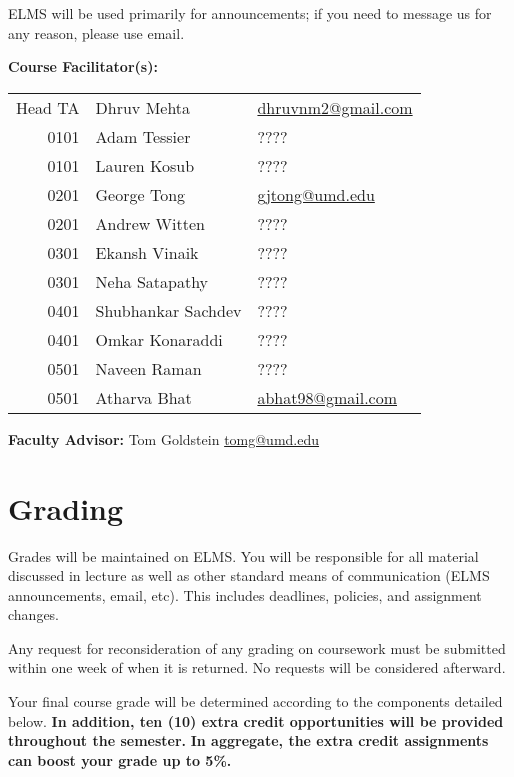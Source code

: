 \documentclass[12pt]{article}
\begin{document}
ELMS will be used primarily for announcements; if you need to message us for any reason,
please use email.

\medskip

\noindent\textbf{Course Facilitator(s): }

\begin{table}[H]
  \begin{tabular}{@{}rll}
    Head TA & Dhruv Mehta     & \href{mailto:dhruvnm2@gmail.com}{dhruvnm2@gmail.com}\\
    0101    & Adam Tessier    & ????\\
    0101    & Lauren Kosub    & ????\\
    0201    & George Tong     & \href{mailto:gjtong@umd.edu}{gjtong@umd.edu}\\
    0201    & Andrew Witten   & ????\\
    0301    & Ekansh Vinaik   & ????\\
    0301    & Neha Satapathy  & ????\\
    0401    & Shubhankar Sachdev & ????\\
    0401    & Omkar Konaraddi & ????\\
    0501    & Naveen Raman    & ????\\
    0501    & Atharva Bhat    & \href{mailto:abhat98@gmail.com}{abhat98@gmail.com}\\ 
  \end{tabular}
\end{table}
\medskip

\noindent\textbf{Faculty Advisor: }Tom Goldstein
\href{mailto:tomg@umd.edu}{tomg@umd.edu} \medskip

\bigskip
\section*{Grading}
\noindent Grades will be maintained on ELMS.
You will be responsible for all material discussed in lecture as well as other standard means of communication (ELMS announcements, email, etc).
This includes deadlines, policies, and assignment changes.

Any request for reconsideration of any grading on coursework must be submitted within one week of when it is returned.
No requests will be considered afterward.

Your final course grade will be determined according to the components detailed below.
\textbf{In addition, ten (10) extra credit opportunities will be provided throughout the semester.}
\textbf{In aggregate, the extra credit assignments can boost your grade up to 5\%.} \medskip
\end{document}

